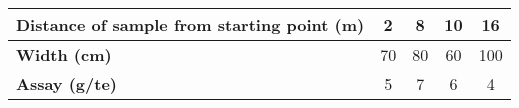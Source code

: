 \begin{center}
\renewcommand{\arraystretch}{1.3}
\setlength{\tabcolsep}{6pt}
\begin{tabular}{ |p{6.5cm}|c|c|c|c| }
  \hline
  {\centering \textbf{Distance of sample from starting point (m)}\par} & \textbf{2} & \textbf{8} & \textbf{10} & \textbf{16} \\ \hline
  {\centering \textbf{Width (cm)}\par}  & 70 & 80 & 60 & 100 \\ \hline
  {\centering \textbf{Assay (g/te)}\par} & 5  & 7  & 6  & 4   \\ \hline
\end{tabular}
\end{center}
